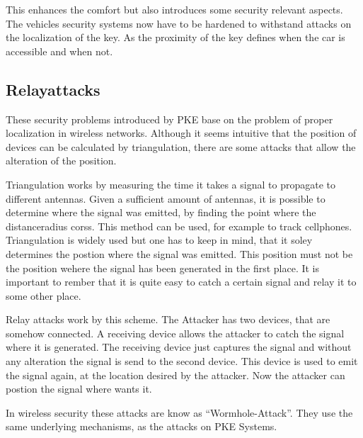 This enhances the comfort but also introduces some security relevant aspects.
The vehicles security systems now have to be hardened
to withstand attacks on the localization of the key.
As the proximity of the key defines when the car is accessible and when not. 

\subsection*{Relayattacks}
These security problems introduced by PKE base on the problem of proper
localization in wireless networks.
Although it seems intuitive that the position of devices can be calculated by
triangulation, there are some attacks that allow the alteration of the position.


Triangulation works by measuring the time it takes a signal to propagate
to different antennas.
Given a sufficient amount of antennas,
it is possible to determine where the signal was emitted,
by finding the point where the distanceradius corss. 				%
This method can be used,
for example to track cellphones.	%
Triangulation is widely used but one has to keep in mind,
that it soley determines the postion where the signal was emitted.
This position must not be the position wehere the signal has been generated in the first place.
It is important to rember that it is quite easy to catch
a certain signal and relay it to some other place.

Relay attacks work by this scheme.
The Attacker has two devices,
that are somehow connected.
A receiving device allows the attacker to catch the signal where it is generated.
The receiving device just captures the signal and
without any alteration the signal is send to the second device.
This device is used to emit the signal again,
at the location desired by the attacker.
Now the attacker can postion the signal where wants it.

In wireless security these attacks are know as ``Wormhole-Attack''.
They use the same underlying mechanisms, as the attacks on PKE Systems.

